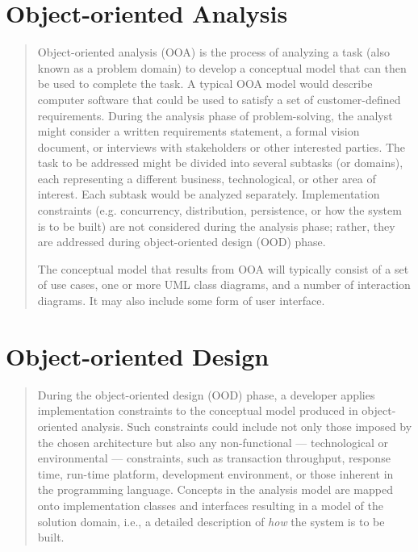 \documentclass [11pt]{book}
\begin{document}
\section{Object-oriented Analysis}

\label{sec:object-orientedanalysis}



\begin{quote}


Object-oriented analysis (OOA) is the process of analyzing
       a task (also known as a problem domain) to develop a conceptual
       model that can then be used to complete the task. A typical OOA
       model would describe computer software that could be used to
       satisfy a set of customer-defined requirements. During the
       analysis phase of problem-solving, the analyst might consider a
       written requirements statement, a formal vision document, or
       interviews with stakeholders or other interested parties. The
       task to be addressed might be divided into several subtasks (or
       domains), each representing a different business,
       technological, or other area of interest. Each subtask would be
       analyzed separately. Implementation
       constraints (e.g. concurrency, distribution, persistence, or
       how the system is to be built) are not considered during the
       analysis phase; rather, they are addressed during
       object-oriented design (OOD) phase.



The conceptual model that results from OOA will typically consist of a
set of use cases, one or more UML class diagrams, and a number of
interaction diagrams. It may also include some form of user interface.



\end{quote}


\section{Object-oriented Design}

\label{sec:object-orienteddesign}



\begin{quote}
During the object-oriented design (OOD) phase, a developer
applies implementation constraints to the conceptual model produced in
object-oriented analysis. Such constraints could include not only
those imposed by the chosen architecture but also any
non-functional --- technological or environmental --- constraints,
such as transaction throughput, response time, run-time platform,
development environment, or those inherent in the programming
language. Concepts in the analysis model are mapped onto
implementation classes and interfaces resulting in a model of the
solution domain, i.e., a detailed description of \emph{how} the system is to be built.

\end{quote}
\end{document}
